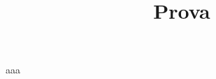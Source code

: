 \documentclass{article}
\title{Prova}
\author{}
\begin{document}
    \maketitle{}
    aaa
\end{document}
